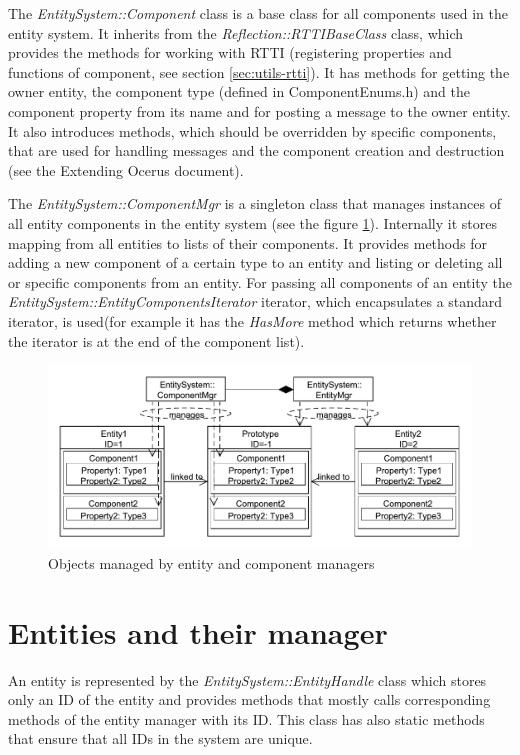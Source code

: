 \documentclass[a4paper, 12pt]{report}
\begin{document}
The \emph{EntitySystem::Component} class is a base class for all components used in the entity system. It inherits from the \emph{Reflection::RTTIBaseClass} class, which provides the methods for working with RTTI (registering properties and functions of component, see section \ref{sec:utils-rtti}). It has methods for getting the owner entity, the component type (defined in ComponentEnums.h) and the component property from its name and for posting a message to the owner entity. It also introduces methods, which should be overridden by specific components, that are used for handling messages and the component creation and destruction (see the Extending Ocerus document).

The \emph{EntitySystem::ComponentMgr} is a singleton class that manages instances of all entity components in the entity system (see the figure \ref{fig:entity-component-managers-diagram}). Internally it stores mapping from all entities to lists of their components. It provides methods for adding a new component of a certain type to an entity and listing or deleting all or specific components from an entity. For passing all components of an entity the \emph{EntitySystem::EntityComponentsIterator} iterator, which encapsulates a standard iterator, is used(for example it has the \emph{HasMore} method which returns whether the iterator is at the end of the component list).

\begin{figure}[htbp]
	\centering
		\includegraphics[width=1\textwidth]{EntityAndComponentManagers.pdf}
	\caption{Objects managed by entity and component managers}
	\label{fig:entity-component-managers-diagram}
\end{figure}

\section{Entities and their manager}

An entity is represented by the \emph{EntitySystem::EntityHandle} class which sto\-res only an ID of the entity and provides methods that mostly calls corresponding methods of the entity manager with its ID. This class has also static methods that ensure that all IDs in the system are unique.
\end{document}

